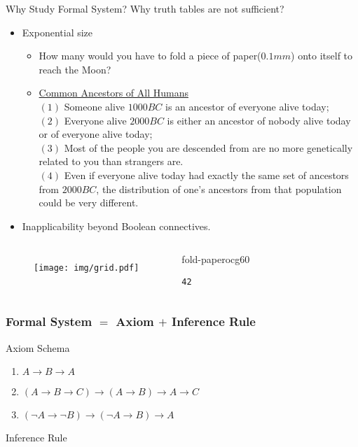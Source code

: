 \documentclass[UTF8,aspectratio=43,11pt,colorlinks,compress,openany]{beamer}%
\begin{document}
\begin{frame}[fragile]{Why Study Formal System?}
	Why truth tables are not sufficient?
	\begin{itemize}
		\item Exponential size
		\begin{itemize}
			\item How many  would you have to fold a piece of paper($0.1mm$) onto itself to reach the Moon?
			\item \href{http://nautil.us/blog/we-are-all-princes-paupers-and-part-of-the-human-family}{Common Ancestors of All Humans}\\
			$(1)$ Someone alive $1000BC$ is an ancestor of everyone alive today;\\
			$(2)$ Everyone alive $2000BC$ is either an ancestor of nobody alive today or of everyone alive today;\\
			$(3)$ Most of the people you are descended from are no more genetically related to you than strangers are.\\
			$(4)$ Even if everyone alive today had exactly the same set of ancestors from $2000BC$, the distribution of one's ancestors from that population could be very different.
		\end{itemize}
		\item Inapplicability beyond Boolean connectives.
	\end{itemize}
\begin{columns}
	\begin{figure}[H]
	\texttt{[image: img/grid.pdf]}
	\end{figure}
\begin{ocg}{fold-paper}{ocg6}{0}
\begin{verbatim}
42
\end{verbatim}
\end{ocg}
\end{columns}
\end{frame}

\begin{frame}\frametitle{Formal System $=$ Axiom $+$ Inference Rule}
		\begin{block}{Axiom Schema}
			\begin{enumerate}
				\item $A\to B\to A$
				\item $(A\to B\to C)\to(A\to B)\to A\to C$
				\item $(\neg A\to\neg B)\to(\neg A\to B)\to A$
			\end{enumerate}
		\end{block}
		\begin{block}{Inference Rule}
			\begin{prooftree}
				\alwaysSingleLine
				\RightLabel{\textcolor{yellow}{[MP]}}
			\end{prooftree}
		\end{block}
\end{frame}
\end{document}
